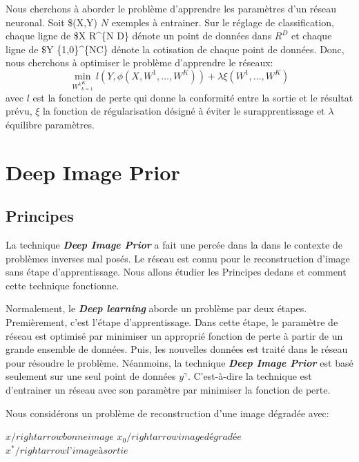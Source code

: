 \documentclass[
  12pt,
  dvipsnames]{article}
\begin{document}
Nous cherchons à aborder le problème d'apprendre les paramètres d'un réseau neuronal. Soit \$(X,Y) \(N\) exemples à entrainer. Sur le réglage de classification, chaque ligne de \$X \in R\^{}\{N \cdot D\} dénote un point de données dans \(R^D\) et chaque ligne de \$Y \in \{1,0\}\^{}\{N\cdot C\} dénote la cotisation de chaque point de données. Donc, nous cherchons à optimiser le problème d'apprendre le réseaux:
\[\min_{{W^k}_{k=1}^K} l(Y,\phi(X,W^1,\dots,W^K))+\lambda \xi(W^1,\dots,W^K)\] avec \(l\) est la fonction de perte qui donne la conformité entre la sortie et le résultat prévu, \(\xi\) la fonction de régularisation désigné à éviter le surapprentissage et \(\lambda\) équilibre paramètres.

\newpage

\hypertarget{deep-image-prior}{%
\section{Deep Image Prior}\label{deep-image-prior}}

\hypertarget{principes}{%
\subsection{Principes}\label{principes}}

La technique \textbf{\emph{Deep Image Prior}} a fait une percée dans la dans le contexte
de problèmes inverses mal posés. Le réseau est connu pour le reconstruction d'image sans étape d'apprentissage. Nous allons étudier les Principes dedans et comment cette technique fonctionne.

Normalement, le \textbf{\emph{Deep learning}} aborde un problème par deux étapes. Premièrement, c'est l'étape d'apprentissage.
Dans cette étape, le paramètre de réseau est optimisé par minimiser un approprié fonction de perte à partir de
un grande ensemble de données. Puis, les nouvelles données est traité dans le réseau pour résoudre le problème.
Néanmoins, la technique \textbf{\emph{Deep Image Prior}} est basé seulement sur une seul point de données \(y^\gamma\). C'est-à-dire
la technique est d'entrainer un réseau avec son paramètre par minimiser la fonction de perte.

Nous considérons un problème de reconstruction d'une image dégradée avec:

\(x /rightarrow bonne image\)
\(x_{0} /rightarrow image dégradée\)
\(x^* /rightarrow l’image à sortie\)
\end{document}
